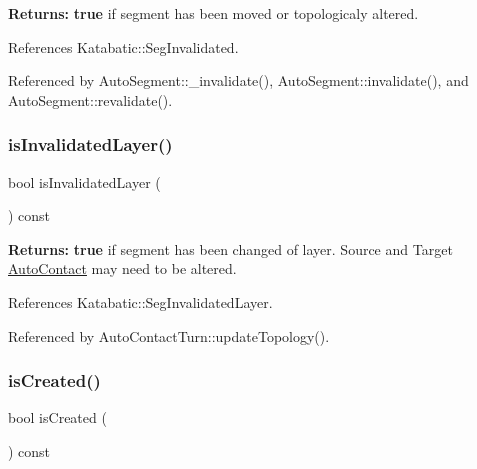 {\bfseries Returns\+:} {\bfseries true} if segment has been moved or topologicaly altered. 

References Katabatic\+::\+Seg\+Invalidated.



Referenced by Auto\+Segment\+::\+\_\+invalidate(), Auto\+Segment\+::invalidate(), and Auto\+Segment\+::revalidate().

\mbox{\label{classKatabatic_1_1AutoSegment_a77b075644356f016105b3050b031a2ec}} 
\subsubsection{\texorpdfstring{is\+Invalidated\+Layer()}{isInvalidatedLayer()}}
{\footnotesize\ttfamily bool is\+Invalidated\+Layer (\begin{DoxyParamCaption}{ }\end{DoxyParamCaption}) const\hspace{0.3cm}{\ttfamily [inline]}}

{\bfseries Returns\+:} {\bfseries true} if segment has been changed of layer. Source and Target \mbox{\hyperlink{classKatabatic_1_1AutoContact}{Auto\+Contact}} may need to be altered. 

References Katabatic\+::\+Seg\+Invalidated\+Layer.



Referenced by Auto\+Contact\+Turn\+::update\+Topology().

\mbox{\label{classKatabatic_1_1AutoSegment_af7d9cf1d7581b1cab04cf38c64f0f72a}} 
\subsubsection{\texorpdfstring{is\+Created()}{isCreated()}}
{\footnotesize\ttfamily bool is\+Created (\begin{DoxyParamCaption}{ }\end{DoxyParamCaption}) const\hspace{0.3cm}{\ttfamily [inline]}}

